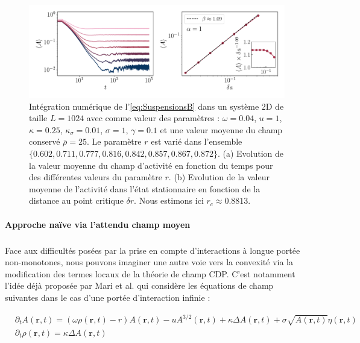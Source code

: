 \begin{figure}[h]
	\centering
	\includegraphics[width=\textwidth]{Chapitre5/Figures/SuspensionsB.pdf}
	\caption{Intégration numérique de l'\autoref{eq:SuspensionsB} dans un système 2D de taille $L=1024$ avec comme valeur des paramètres : $\omega = 0.04$, $u = 1$, $\kappa = 0.25$, $\kappa_\sigma = 0.01$, $\sigma = 1$, $\gamma = 0.1$ et une valeur moyenne du champ conservé $\bar{\rho} = 25$. Le paramètre $r$ est varié dans l'ensemble $\{ 0.602, 0.711, 0.777, 0.816, 0.842, 0.857, 0.867, 0.872\}$. (a) Evolution de la valeur moyenne du champ d'activité en fonction du temps pour des différentes valeurs du paramètre $r$. (b) Evolution de la valeur moyenne de l'activité dans l'état stationnaire en fonction de la distance au point critique $\delta r$. Nous estimons ici $r_c \approx 0.8813$.}
	\label{fig:SuspensionsB}
\end{figure}

\paragraph{Approche naïve via l'attendu champ moyen}

\label{sec:CMnaif}

\subparagraph{}Face aux difficultés posées par la prise en compte d'interactions à longue portée non-monotones, nous pouvons imaginer une autre voie vers la convexité via la modification des termes locaux de la théorie de champ CDP. C'est notamment l'idée déjà proposée par Mari et al. \cite{mari_absorbing_2022} qui considère les équations de champ suivantes dans le cas d'une portée d'interaction infinie :

\begin{equation}
\begin{aligned}
	&\partial_t A(\mathbf{r}, t) = (\omega\rho (\mathbf{r}, t) - r)A(\mathbf{r}, t) - uA^{3/2}(\mathbf{r}, t) + \kappa\Delta A (\mathbf{r}, t) + \sigma \sqrt{A(\mathbf{r}, t)} \eta(\mathbf{r}, t)\\
	&\partial_t \rho (\mathbf{r}, t) = \kappa\Delta A (\mathbf{r}, t)
\end{aligned}
\label{eq:CDP32}
\end{equation}


